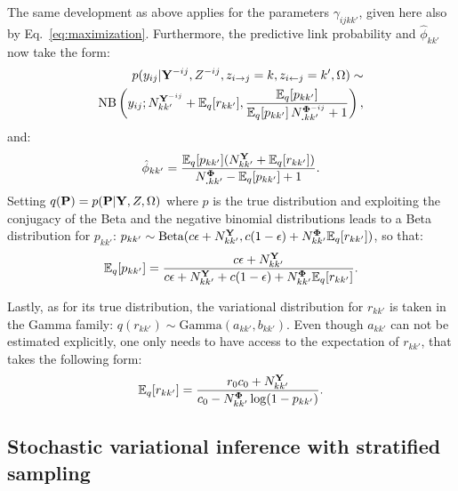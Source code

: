 The same development as above applies for the parameters $\gamma_{ijkk'}$, given here also by Eq.~\ref{eq:maximization}. Furthermore, the predictive link probability and $\hat \phi_{kk'}$ now take the form:
%
\begin{align*}
p(y_{ij} | {\mathbf{Y}}^{-ij}, Z^{- ij}, z_{i\rightarrow j}=k, z_{i\leftarrow j}=k',\Omega) \sim \\
\mathrm{NB}\left(y_{ij}; N^{{\mathbf{Y}}^{-ij}}_{kk'} + \mathbb{E}_{q}[r_{kk'}], \frac{\mathbb{E}_{q}[p_{kk'}]}{\mathbb{E}_{q}[p_{kk'}]\,N^{{\boldsymbol{\Phi}}^{-ij}}_{\bm{.}kk'} + 1} \right),
\end{align*}
%
and:
%
\begin{align*}
\hat \phi_{kk'} = \frac{\mathbb{E}_{q}[p_{kk'}](N^{\mathbf{Y}}_{kk'} + \mathbb{E}_{q}[r_{kk'}])}{N^{{\boldsymbol{\Phi}}}_{\bm{.}kk'} - \mathbb{E}_{q}[p_{kk'}] + 1}.
\end{align*}
%
Setting $q({\mathbf{P}}) = p({\mathbf{P}}|{\mathbf{Y}},Z,\Omega)$ where $p$ is the true distribution and exploiting the conjugacy of the Beta and the negative binomial distributions leads to a Beta distribution for $p_{kk'}$: $p_{kk'} \sim \textrm{Beta}(c\epsilon + N^{\mathbf{Y}}_{kk'}, c(1-\epsilon) + N^{\boldsymbol{\Phi}}_{kk'}\mathbb{E}_{q}[r_{kk'}])$,
so that:
\[
\mathbb{E}_{q}[p_{kk'}] = \frac{c\epsilon + N^{\mathbf{Y}}_{kk'}}{c\epsilon + N^{\mathbf{Y}}_{kk'} + c(1-\epsilon) + N^{\boldsymbol{\Phi}}_{kk'}\mathbb{E}_{q}[r_{kk'}]}.
\]

Lastly, as for its true distribution, the variational distribution for $r_{kk'}$ is taken in the Gamma family:  $q(r_{kk'}) \sim \textrm{Gamma}(a_{kk'},b_{kk'})$. Even though $a_{kk'}$ can not be estimated explicitly, one only needs to have access to the expectation of $r_{kk'}$, that takes the following form:
\[
\mathbb{E}_{q}[r_{kk'}] = \frac{r_0c_0+N^{\mathbf{Y}}_{kk'}}{c_0  -N^{\boldsymbol{\Phi}}_{kk'}\log(1-p_{kk'})}.
\]
%

\subsection{Stochastic variational inference with stratified sampling}

